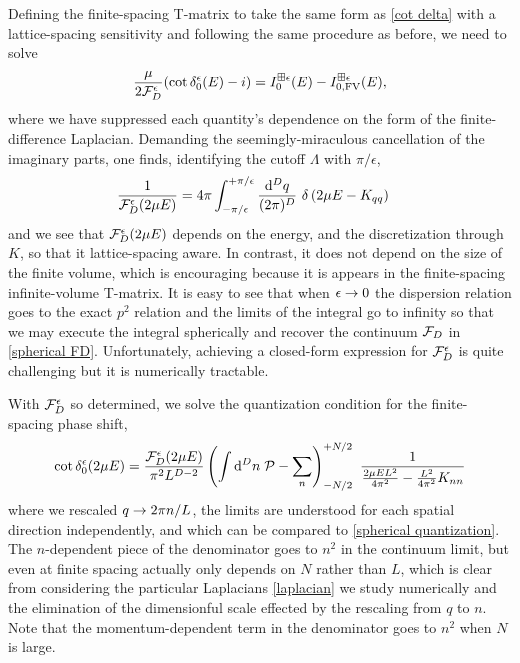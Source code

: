 Defining the finite-spacing T-matrix to take the same form as \eqref{cot delta} with a lattice-spacing sensitivity and following the same procedure as before, we need to solve
\begin{equation}
    \frac{\mu}{2\mathcal{F}_D^\epsilon}(\cot \delta_0^\epsilon(E) - i) = I_0^{\boxplus \epsilon}(E) - I_{0,\textrm{FV}}^{\boxplus \epsilon}(E),
\end{equation}
where we have suppressed each quantity's dependence on the form of the finite-difference Laplacian.
Demanding the seemingly-miraculous cancellation of the imaginary parts, one finds, identifying the cutoff $\Lambda$ with $\pi/\epsilon$,
\begin{align}
    \frac{1}{\mathcal{F}_D^\epsilon(2\mu E)} &= 4\pi \int_{-\pi/\epsilon}^{+\pi/\epsilon} \frac{\mathrm{d}^D q}{(2\pi)^D}\
    \delta\left(2\mu E - K_{qq}\right)
\end{align}
and we see that $\mathcal{F}_D^\epsilon(2\mu E)$ depends on the energy, and the discretization through $K$, so that it lattice-spacing aware.
In contrast, it does not depend on the size of the finite volume, which is encouraging because it is appears in the finite-spacing infinite-volume T-matrix.
It is easy to see that when $\epsilon\rightarrow0$ the dispersion relation goes to the exact $p^2$ relation and the limits of the integral go to infinity so that we may execute the integral spherically and recover the continuum $\mathcal{F}_D$ in \eqref{spherical FD}.
Unfortunately, achieving a closed-form expression for $\mathcal{F}_D^\epsilon$ is quite challenging but it is numerically tractable.

With $\mathcal{F}_D^\epsilon$ so determined, we solve the quantization condition for the finite-spacing phase shift,
\begin{align}
    \cot \delta_0^\epsilon(2\mu E)
    =
    \frac{\mathcal{F}_D^\epsilon(2\mu E)}{\pi^2 L^{D-2}}
    \left(\int \mathrm{d}^D n\; \mathcal{P} - \sum_n \right)_{-N/2}^{+N/2}\  \frac{1}{\frac{2\mu E L^2}{4\pi^2} - \frac{L^2}{4\pi^2} K_{nn}}
\end{align}
where we rescaled $q\rightarrow 2\pi n/L$, the limits are understood for each spatial direction independently, and which can be compared to \eqref{spherical quantization}.
The $n$-dependent piece of the denominator goes to $n^2$ in the continuum limit, but even at finite spacing actually only depends on $N$ rather than $L$, which is clear from considering the particular Laplacians \eqref{laplacian} we study numerically and the elimination of the dimensionful scale effected by the rescaling from $q$ to $n$.
Note that the momentum-dependent term in the denominator goes to $n^2$ when $N$ is large.

